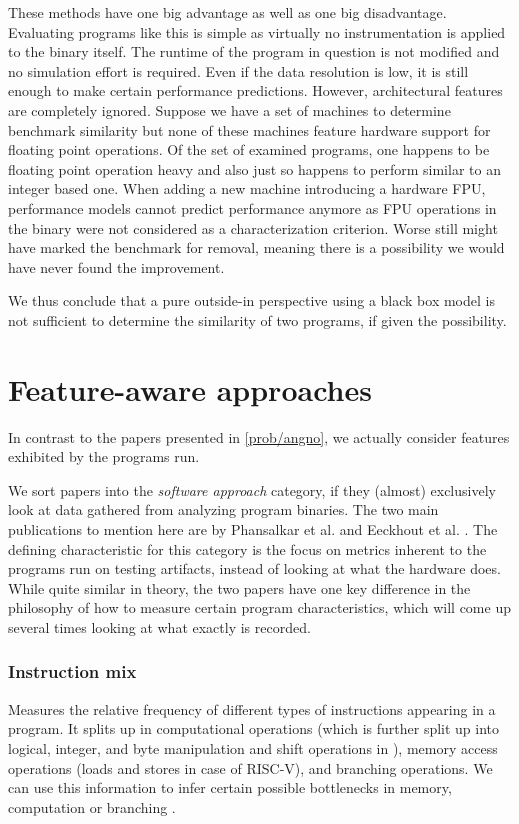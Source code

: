 \documentclass[../bachelor_paper.tex]{subfiles}
\begin{document}
These methods have one big advantage as well as one big disadvantage. Evaluating programs like this is simple as virtually no instrumentation is applied to the binary itself. The runtime of the program in question is not modified and no simulation effort is required. Even if the data resolution is low, it is still enough to make certain performance predictions. However, architectural features are completely ignored. Suppose we have a set of machines to determine benchmark similarity but none of these machines feature hardware support for floating point operations. Of the set of examined programs, one happens to be floating point operation heavy and also just so happens to perform similar to an integer based one. When adding a new machine introducing a hardware \ac{FPU}, performance models cannot predict performance anymore as \ac{FPU} operations in the binary were not considered as a characterization criterion. Worse still \cite{vandierendonckManyBenchmarksStress} might have marked the benchmark for removal, meaning there is a possibility we would have never found the improvement.

We thus conclude that a pure outside-in perspective using a black box model is not sufficient to determine the similarity of two programs, if given the possibility.

\section{Feature-aware approaches}
In contrast to the papers presented in \ref{prob/angno}, we actually consider features exhibited by the programs run. 


We sort papers into the \emph{software approach} category, if they (almost) exclusively look at data gathered from analyzing program binaries. The two main publications to mention here are by Phansalkar et al. \cite{phansalkarMeasuringProgramSimilarity2005} and Eeckhout et al. \cite{eeckhoutDesigningComputerArchitecture2003}. The defining characteristic for this category is the focus on metrics inherent to the programs run on testing artifacts, instead of looking at what the hardware does. While quite similar in theory, the two papers have one key difference in the philosophy of how to measure certain program characteristics, which will come up several times looking at what exactly is recorded.

\subsubsection{Instruction mix}
	\label{ch:theo/simi/soft/inst}
Measures the relative frequency of different types of instructions appearing in a program. It splits up in computational operations (which is further split up into logical, integer, and byte manipulation and shift operations in \cite{eeckhoutDesigningComputerArchitecture2003}), memory access operations (loads and stores in case of RISC-V), and branching operations. We can use this information to infer certain possible bottlenecks in memory, computation or branching \cite{phansalkarMeasuringProgramSimilarity2005}.
\end{document}
